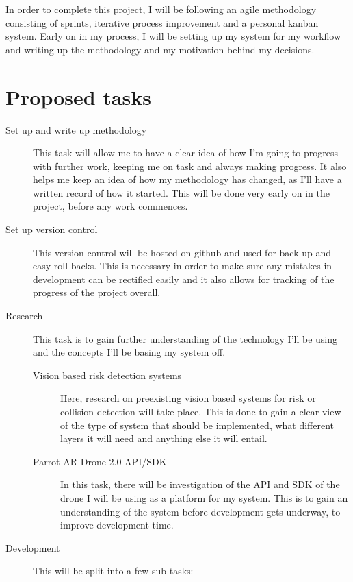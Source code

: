 \documentclass[11pt,fleqn,twoside]{article}
\begin{document}
In order to complete this project, I will be following an agile methodology consisting of sprints, iterative process improvement and a personal kanban system\cite{PersonalKanban}. Early on in my process, I will be setting up my system for my workflow and writing up the methodology and my motivation behind my decisions.
\section{Proposed tasks}
\begin{description}
  \item[Set up and write up methodology]
    This task will allow me to have a clear idea of how I'm going to progress with further work, keeping me on task and always making progress. It also helps me keep an idea of how my methodology has changed, as I'll have a written record of how it started. This will be done very early on in the project, before any work commences.
  \item[Set up version control]
    This version control will be hosted on github and used for back-up and easy roll-backs. This is necessary in order to make sure any mistakes in development can be rectified easily and it also allows for tracking of the progress of the project overall.
  \item[Research]
  This task is to gain further understanding of the technology I'll be using and the concepts I'll be basing my system off.
    \begin{description}
      \item[Vision based risk detection systems]
        Here, research on preexisting vision based systems for risk or collision detection will take place. This is done to gain a clear view of the type of system that should be implemented, what different layers it will need and anything else it will entail.
      \item[Parrot AR Drone 2.0 API/SDK]
        In this task, there will be investigation of the API and SDK of the drone I will be using as a platform for my system. This is to gain an understanding of the system before development gets underway, to improve development time. 
    \end{description}
  \item[Development]
    This will be split into a few sub tasks:
    \begin{description}

\end{description}
\end{description}
\end{document}
